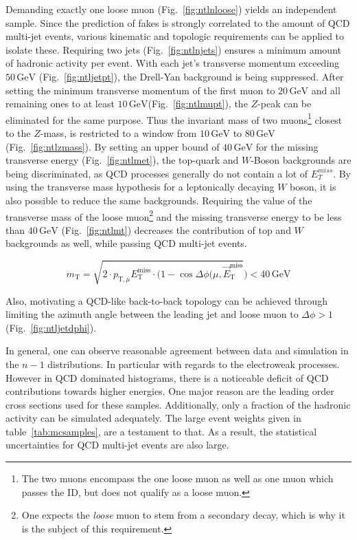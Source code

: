 Demanding exactly one loose muon (Fig.~\ref{fig:ntlnloose}) yields an independent sample. Since the prediction of fakes is strongly correlated to the amount of QCD multi-jet events, various kinematic and topologic requirements can be applied to isolate these. Requiring two jets (Fig.~\ref{fig:ntlnjets}) ensures a minimum amount of hadronic activity per event. With each jet's transverse momentum exceeding $50\,\text{GeV}$ (Fig.~\ref{fig:ntljetpt}), the Drell-Yan background is being suppressed. After setting the minimum transverse momentum of the first muon to $20\,\text{GeV}$ and all remaining ones to at least $10\,\text{GeV}$(Fig.~\ref{fig:ntlmupt}), the $Z$-peak can be eliminated for the same purpose. Thus the invariant mass of two muons\footnote{The two muons encompass the one loose muon as well as one muon which passes the ID, but does not qualify as a loose muon.} closest to the $Z$-mass, is restricted to a window from $10\,\text{GeV}$ to $80\,\text{GeV}$ (Fig.~\ref{fig:ntlzmass}). By setting an upper bound of $40\,\text{GeV}$ for the missing transverse energy (Fig.~\ref{fig:ntlmet}), the top-quark and $W$-Boson backgrounds are being discriminated, as QCD processes generally do not contain a lot of $E_{T}^{miss}$. By using the transverse mass hypothesis for a leptonically decaying $W$ boson, it is also possible to reduce the same backgrounds.
Requiring the value of the transverse mass of the loose muon\footnote{One expects the \textit{loose} muon to stem from a secondary decay, which is why it is the subject of this requirement.} and the missing transverse energy to be less than $40\,\text{GeV}$ (Fig.~\ref{fig:ntlmt}) decreases the contribution of top and $W$ backgrounds as well, while passing QCD multi-jet events. 

\begin{equation}
  \label{eq:transverse-mass}
  m_{\text{T}} = \sqrt{2 \cdot p_{\text{T},\mu} E^{\text{miss}}_{\text{T}} \cdot ( 1 - \cos{\Delta \phi(\mu, \vec{E}^{\text{miss}}_{\text{T}}}} ) < 40\,\text{GeV}
\end{equation}

\noindent Also, motivating a QCD-like back-to-back topology can be achieved through limiting the azimuth angle between the leading jet and loose muon to $\Delta \phi > 1$ (Fig.~\ref{fig:ntljetdphi}).

In general, one can observe reasonable agreement between data and simulation in the $n - 1$ distributions. In particular with regards to the electroweak processes. However in QCD dominated histograms, there is a noticeable deficit of QCD contributions towards higher energies. One major reason are the leading order cross sections used for these samples. Additionally, only a fraction of the hadronic activity can be simulated adequately. The large event weights given in table~\ref{tab:mcsamples}, are a testament to that. As a result, the statistical uncertainties for QCD multi-jet events are also large.

